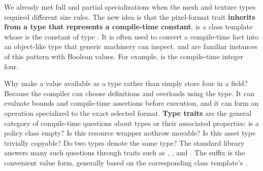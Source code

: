We already met full and partial specializations when the mesh and texture types required different size rules. The new idea is that the pixel-format trait \textbf{inherits from a type that represents a compile-time constant}.  is a class template whose  is the constant  of type . It is often used to convert a compile-time fact into an object-like type that generic machinery can inspect.  and  are familiar instances of this pattern with Boolean values. For example,  is the compile-time integer four.

Why make a value available as a type rather than simply store four in a field? Because the compiler can choose definitions and overloads using the type. It can evaluate bounds and compile-time assertions before execution, and it can form an operation specialized to the exact selected format. \textbf{Type traits} are the general category of compile-time questions about types or their associated properties: is a policy class empty? Is this resource wrapper nothrow movable? Is this asset type trivially copyable? Do two types denote the same type? The standard library answers many such questions through traits such as , , and . The suffix  is the convenient value form, generally based on the corresponding class template's .

